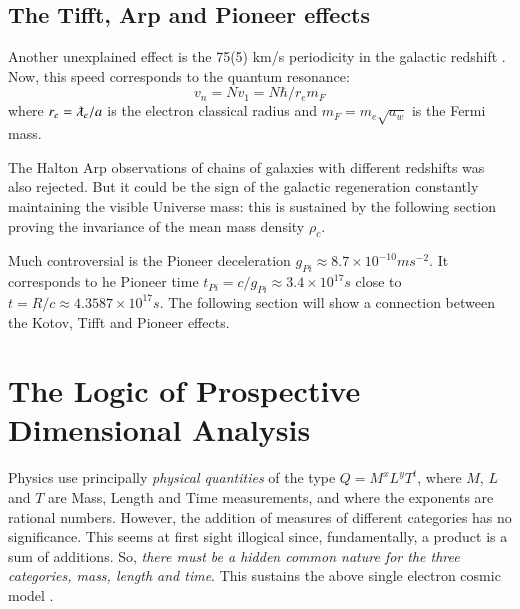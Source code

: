 \documentclass[twoside,draft]{article}
\begin{document}
\begin{sloppypar}
\subsection{The Tifft, Arp and Pioneer effects}

Another unexplained effect is the 75(5) km/s periodicity in the galactic redshift \cite{Tifft}. Now, this speed corresponds to the quantum resonance: $$ v_{n} = N v_{1} = N \hbar /r_{e} m_{F} $$ where $r_{e} = \lambdabar_e/a$ is the electron classical radius and $m_{F} = m_{e}\sqrt{a_{w}}$ is the Fermi mass.

The Halton Arp observations of chains of galaxies with different redshifts \cite{Arp} was also rejected. But it could be the sign of the galactic regeneration constantly maintaining the visible Universe mass: this is sustained by the following section proving the invariance of the mean mass density $\rho_{c}$.

Much controversial is the Pioneer deceleration \cite{Nieto} $g_{Pi} \approx 8.7 \times 10^{-10} ms^{-2}$. It corresponds to he Pioneer time $t_{Pi} = c/g_{Pi} \approx 3.4 \times 10^{17} s $ close to $t = R/c \approx 4.3587 \times 10^{17} s $. The following section will show a connection between the Kotov, Tifft and Pioneer effects.

\section{The Logic of Prospective Dimensional Analysis}

Physics use principally \textit{physical quantities} of the type $Q = M^{x} L^{y} T^{t}$, where $M$, $L$ and $T$ are Mass, Length and Time measurements, and where the exponents are rational numbers. However, the addition of measures of different categories has no significance. This seems at first sight illogical since, fundamentally, a product is a sum of additions. So, \textit{there must be a hidden common nature for the three categories, mass, length and time}. This sustains the above single electron cosmic model \cite{Sanchez1}. 


\end{sloppypar}
\end{document}
